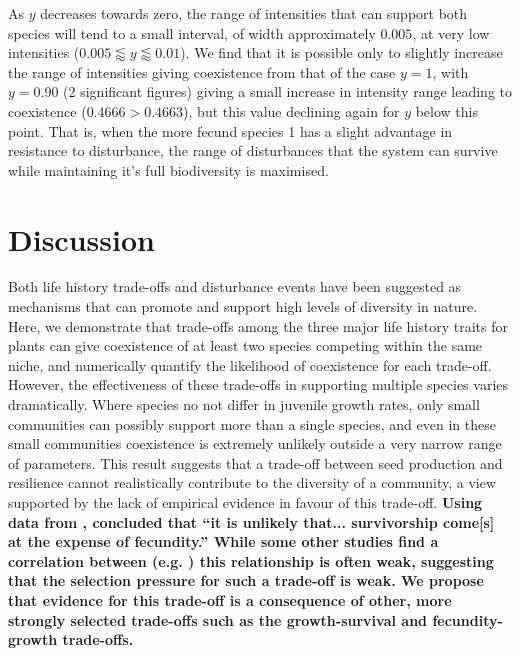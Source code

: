 \documentclass[preprint,10pt,reqno]{amsart}
\begin{document}
As $y$ decreases towards zero, the range of intensities that can support both species will tend to a small interval, of width approximately $0.005$, at very low intensities ($0.005\lessapprox y \lessapprox 0.01$). We find that it is possible only to slightly increase the range of intensities giving coexistence from that of the case $y=1$, with $y=0.90$ (2 significant figures) giving a small increase in intensity range leading to coexistence ($0.4666>0.4663$), but this value declining again for $y$ below this point. That is, when the more fecund species 1 has a slight advantage in resistance to disturbance, the range of disturbances that the system can survive while maintaining it's full biodiversity is maximised.

\section{Discussion}
Both life history trade-offs and disturbance events have been suggested as mechanisms that can promote and support high levels of diversity in nature. Here, we demonstrate that trade-offs among the three major life history traits for plants can give coexistence of at least two species competing within the same niche, and numerically quantify the likelihood of coexistence for each trade-off. However, the effectiveness of these trade-offs in supporting multiple species varies dramatically. Where species no not differ in juvenile growth rates, only small communities can possibly support more than a single species, and even in these small communities coexistence is extremely unlikely outside a very narrow range of parameters. This result suggests that a trade-off between seed production and resilience cannot realistically contribute to the diversity of a community, a view supported by the lack of empirical evidence in favour of this trade-off. \textbf{Using data from \cite{martin2010dispersal}, \cite{martin2010divergence} concluded that ``it is unlikely that... survivorship come[s] at the expense of fecundity.'' While some other studies find a correlation between (e.g. \cite{marquis1984leaf,gwynn2005resistance}) this relationship is often weak, suggesting that the selection pressure for such a trade-off is weak. We propose that evidence for this trade-off is a consequence of other, more strongly selected trade-offs such as the growth-survival and fecundity-growth trade-offs.}
\end{document}

